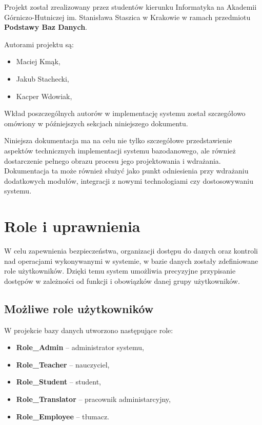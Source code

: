 \documentclass[12pt]{article}
\begin{document}
\noindent Projekt został zrealizowany przez studentów kierunku Informatyka na Akademii Górniczo-Hutniczej im. Stanisława Staszica w Krakowie w ramach przedmiotu \textbf{Podstawy Baz Danych}. 

\noindent Autorami projektu są:
\begin{itemize}
    \item Maciej Kmąk,
    \item Jakub Stachecki,
    \item Kacper Wdowiak, 
\end{itemize}

\noindent Wkład poszczególnych autorów w implementację systemu został szczegółowo omówiony w późniejszych sekcjach niniejszego dokumentu.


\noindent Niniejsza dokumentacja ma na celu nie tylko szczegółowe przedstawienie aspektów technicznych implementacji systemu bazodanowego, ale również dostarczenie pełnego obrazu procesu jego projektowania i wdrażania. Dokumentacja ta może również służyć jako punkt odniesienia przy wdrażaniu dodatkowych modułów, integracji z nowymi technologiami czy dostosowywaniu systemu.

\newpage
\section{Role i uprawnienia}

W celu zapewnienia bezpieczeństwa, organizacji dostępu do danych oraz kontroli nad operacjami wykonywanymi w systemie, w bazie danych zostały zdefiniowane role użytkowników. Dzięki temu system umożliwia precyzyjne przypisanie dostępów w zależności od funkcji i obowiązków danej grupy użytkowników.

\subsection{Możliwe role użytkowników}
W projekcie bazy danych utworzono następujące role:
\begin{itemize}
    \item \textbf{Role\_Admin} -- administrator systemu,
    \item \textbf{Role\_Teacher} -- nauczyciel,
    \item \textbf{Role\_Student} -- student,
    \item \textbf{Role\_Translator} -- pracownik administarcyjny,
    \item \textbf{Role\_Employee} -- tłumacz.
\end{itemize}
\end{document}
